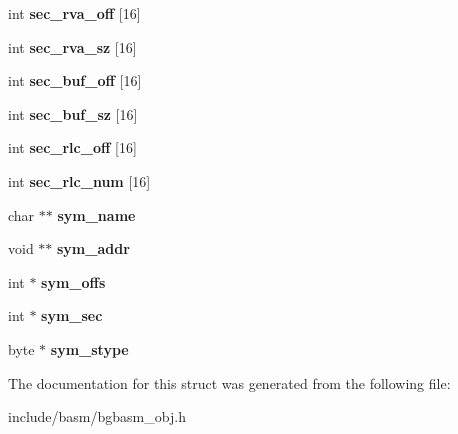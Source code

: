 \begin{DoxyCompactItemize}
\item 
\hypertarget{structBASM__COFF__Info__s_a0d36aacff728c298e28066f23921c322}{int {\bfseries sec\-\_\-rva\-\_\-off} \mbox{[}16\mbox{]}}\label{structBASM__COFF__Info__s_a0d36aacff728c298e28066f23921c322}

\item 
\hypertarget{structBASM__COFF__Info__s_acd97d50ca284fdaa6d7e41e918abc984}{int {\bfseries sec\-\_\-rva\-\_\-sz} \mbox{[}16\mbox{]}}\label{structBASM__COFF__Info__s_acd97d50ca284fdaa6d7e41e918abc984}

\item 
\hypertarget{structBASM__COFF__Info__s_a418c81483e38c48848f95e5f4469cd24}{int {\bfseries sec\-\_\-buf\-\_\-off} \mbox{[}16\mbox{]}}\label{structBASM__COFF__Info__s_a418c81483e38c48848f95e5f4469cd24}

\item 
\hypertarget{structBASM__COFF__Info__s_a3e8e652609dac7020483260be05a9f84}{int {\bfseries sec\-\_\-buf\-\_\-sz} \mbox{[}16\mbox{]}}\label{structBASM__COFF__Info__s_a3e8e652609dac7020483260be05a9f84}

\item 
\hypertarget{structBASM__COFF__Info__s_ac411d16bb224268060b3f2805e48fbbe}{int {\bfseries sec\-\_\-rlc\-\_\-off} \mbox{[}16\mbox{]}}\label{structBASM__COFF__Info__s_ac411d16bb224268060b3f2805e48fbbe}

\item 
\hypertarget{structBASM__COFF__Info__s_ae1ebfdcb5d4954fce757f33a7b9f0fec}{int {\bfseries sec\-\_\-rlc\-\_\-num} \mbox{[}16\mbox{]}}\label{structBASM__COFF__Info__s_ae1ebfdcb5d4954fce757f33a7b9f0fec}

\item 
\hypertarget{structBASM__COFF__Info__s_a80adf1eba56a778fffa8946d9fe7202e}{char $\ast$$\ast$ {\bfseries sym\-\_\-name}}\label{structBASM__COFF__Info__s_a80adf1eba56a778fffa8946d9fe7202e}

\item 
\hypertarget{structBASM__COFF__Info__s_a1bf4c2885f2e83c2157b2b6d502ad2e9}{void $\ast$$\ast$ {\bfseries sym\-\_\-addr}}\label{structBASM__COFF__Info__s_a1bf4c2885f2e83c2157b2b6d502ad2e9}

\item 
\hypertarget{structBASM__COFF__Info__s_a7baed2c3c3fe23af41c9853380287a15}{int $\ast$ {\bfseries sym\-\_\-offs}}\label{structBASM__COFF__Info__s_a7baed2c3c3fe23af41c9853380287a15}

\item 
\hypertarget{structBASM__COFF__Info__s_a061a268a7b8a3166974c7db73b954246}{int $\ast$ {\bfseries sym\-\_\-sec}}\label{structBASM__COFF__Info__s_a061a268a7b8a3166974c7db73b954246}

\item 
\hypertarget{structBASM__COFF__Info__s_aca8110ec1a4145fdf29a4dc437e566f1}{byte $\ast$ {\bfseries sym\-\_\-stype}}\label{structBASM__COFF__Info__s_aca8110ec1a4145fdf29a4dc437e566f1}

\end{DoxyCompactItemize}


The documentation for this struct was generated from the following file\-:\begin{DoxyCompactItemize}
\item 
include/basm/bgbasm\-\_\-obj.\-h\end{DoxyCompactItemize}
